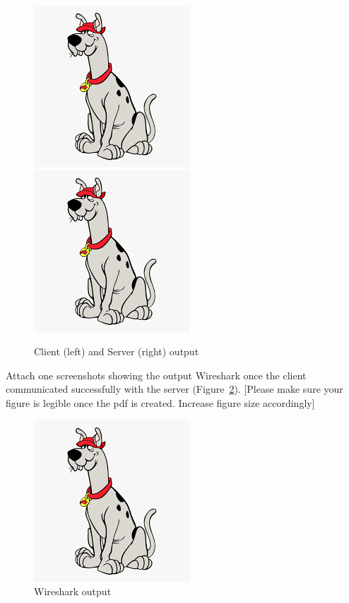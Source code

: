 \documentclass[11pt]{article}
\begin{document}
\begin{figure}
\includegraphics[width=.49\columnwidth]{dummy.png}
\includegraphics[width=.49\columnwidth]{dummy.png}
\caption{Client (left) and Server (right) output}
\label{fig:problem4-1}
\end{figure}

Attach one screenshots showing the output Wireshark once the client communicated successfully with the server (Figure~\ref{fig:problem4-2}). [Please make sure your figure is legible once the pdf is created. Increase figure size accordingly]

\begin{figure}
\centering
\includegraphics[width=.49\columnwidth]{dummy.png}
\caption{Wireshark output}
\label{fig:problem4-2}
\end{figure}
\end{document}
